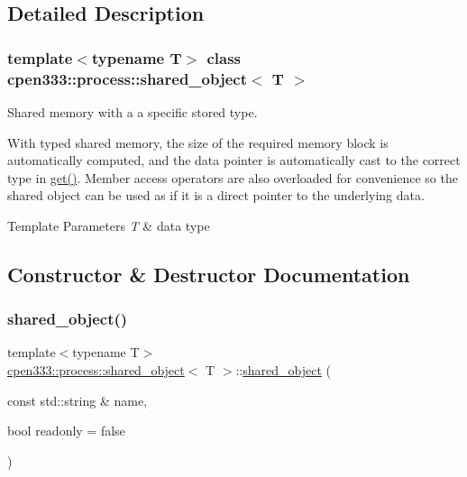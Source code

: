 \subsection{Detailed Description}
\subsubsection*{template$<$typename T$>$\newline
class cpen333\+::process\+::shared\+\_\+object$<$ T $>$}

Shared memory with a a specific stored type. 

With typed shared memory, the size of the required memory block is automatically computed, and the data pointer is automatically cast to the correct type in \hyperlink{classcpen333_1_1process_1_1shared__object_ac6d38c3ca35cfb102905b6e9dbe4b1ce}{get()}. Member access operators are also overloaded for convenience so the shared object can be used as if it is a direct pointer to the underlying data.


\begin{DoxyTemplParams}{Template Parameters}
{\em T} & data type \\
\hline
\end{DoxyTemplParams}


\subsection{Constructor \& Destructor Documentation}
\mbox{\label{classcpen333_1_1process_1_1shared__object_ac8e7c58b5066b058d32e27a7d068f504}} 
\subsubsection{\texorpdfstring{shared\+\_\+object()}{shared\_object()}}
{\footnotesize\ttfamily template$<$typename T$>$ \\
\hyperlink{classcpen333_1_1process_1_1shared__object}{cpen333\+::process\+::shared\+\_\+object}$<$ T $>$\+::\hyperlink{classcpen333_1_1process_1_1shared__object}{shared\+\_\+object} (\begin{DoxyParamCaption}\item[{const std\+::string \&}]{name,  }\item[{bool}]{readonly = {\ttfamily false} }\end{DoxyParamCaption})\hspace{0.3cm}{\ttfamily [inline]}}



